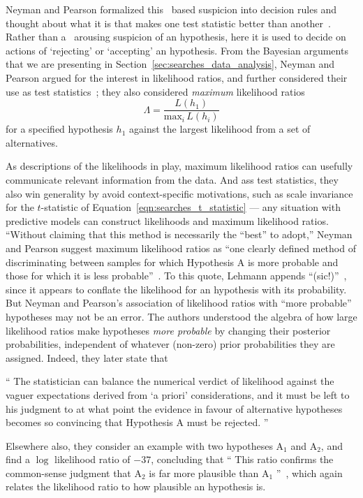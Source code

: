 Neyman and Pearson formalized this \pvalue\ based suspicion into decision
rules and thought about what it is that makes one test statistic better than
another~\cite{neymanpearson1928max, neymanpearson1933lemma}.
Rather than a \pvalue\ arousing suspicion of an hypothesis, here it is used
to decide on actions of `rejecting' or `accepting' an hypothesis.
From the Bayesian arguments that we are presenting in
Section~\ref{sec:searches_data_analysis},
Neyman and Pearson argued for the interest in likelihood ratios, and further
considered their use as test statistics~\cite{neymanpearson1928max};
they also considered \emph{maximum} likelihood ratios
\begin{equation}
\label{eqn:searches_max_like_ratio}
\Lambda =
\frac{L(h_1)}{\mathrm{max}_i\,L(h_i)}
\end{equation}
for a specified hypothesis $h_1$ against the largest likelihood from a set
of alternatives.

As descriptions of the likelihoods in play, maximum likelihood ratios can
usefully communicate relevant information from the data.
And ass test statistics, they also win generality by avoid context-specific
motivations, such as scale invariance for the $t$-statistic of
Equation~\ref{eqn:searches_t_statistic} --- any situation with predictive
models can construct likelihoods and maximum likelihood ratios.
``Without claiming that this method is necessarily the ``best'' to adopt,''
Neyman and Pearson suggest maximum likelihood ratios as
``one clearly defined method of discriminating between samples for which
Hypothesis A is more probable and those for which it is less probable''~\cite{
neymanpearson1933lemma}.
To this quote, Lehmann appends ``(sic!)''~\cite{lehmann2011fisher}, since it
appears to conflate the likelihood for an hypothesis with its probability.
But Neyman and Pearson's association of likelihood ratios with
``more probable'' hypotheses may not be an error.
The authors understood the algebra of how large likelihood ratios make
hypotheses \emph{more probable} by changing their posterior probabilities,
independent of whatever (non-zero) prior probabilities they are assigned.
Indeed, they later state that
\begin{displayquote}
``%
The statistician can balance the numerical verdict of likelihood against the
vaguer expectations derived from `a priori' considerations, and it must be left
to his judgment to at what point the evidence in favour of alternative
hypotheses becomes so convincing that Hypothesis A must be rejected.%
''~\cite{neymanpearson1933lemma}
\end{displayquote}
Elsewhere also, they consider an example with two hypotheses $\mathrm{A}_1$
and $\mathrm{A}_2$, and find a $\log$ likelihood ratio of
$-37$, concluding that
``%
This ratio confirms the common-sense judgment that $\mathrm{A}_2$ is far more
plausible than $\mathrm{A}_1$%
''~\cite{neymanpearson1928max},
which again relates the likelihood ratio to how plausible an hypothesis is.

